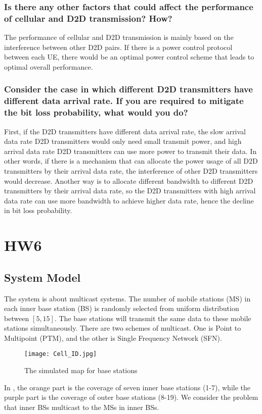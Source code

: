 \documentclass[conference]{IEEEtran}
\begin{document}
\subsubsection{Is there any other factors that could affect the performance of cellular and D2D transmission? How?}
The performance of cellular and D2D transmission is mainly based on the interference between other D2D pairs. If there is a power control protocol between each UE, there would be an optimal power control scheme that leads to optimal overall performance.
\subsubsection{Consider the case in which different D2D transmitters have different data arrival rate. If you are required to mitigate the bit loss probability, what would you do?}
First, if the D2D transmitters have different data arrival rate, the slow arrival data rate D2D transmitters would only need small transmit power, and high arrival data rate D2D transmitters can use more power to transmit their data. In other words, if there is a mechanism that can allocate the power usage of all D2D transmitters by their arrival data rate, the interference of other D2D transmitters would decrease. Another way is to allocate different bandwidth to different D2D transmitters by their arrival data rate, so the D2D transmitters with high arrival data rate can use more bandwidth to achieve higher data rate, hence the decline in bit loss probability.
\section{HW6}

\subsection{System Model}
The system is about multicast systems. The number of mobile stations (MS) in each inner base station (BS) is randomly selected from uniform distribution between $[5, 15]$. The base stations will transmit the same data to these mobile stations simultaneously. There are two schemes of multicast. One is Point to Multipoint (PTM), and the other is Single Frequency Network (SFN).

\begin{figure}[htbp]
    \centering
    \texttt{[image: Cell\_ID.jpg]}
    \caption{The simulated map for base stations}
    \label{fig:bs_map}
\end{figure}
In , the orange part is the coverage of seven inner base stations (1-7), while the purple part is the coverage of outer base stations (8-19). We consider the problem that inner BSs multicast to the MSs in inner BSs.
\end{document}
